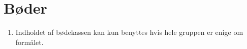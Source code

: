 \section{Bøder}
\begin{enumerate}
\item{Indholdet af bødekassen kan kun benyttes hvis hele gruppen er enige om formålet.}
\end{enumerate}
